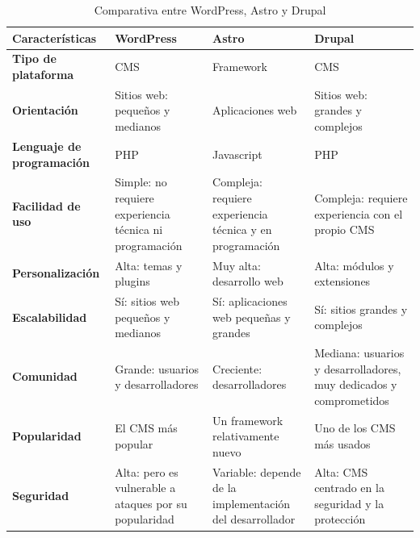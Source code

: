             \begin{table}[!htbp]
                \centering
                
                \small
                
                \begin{tabular}{|>{\centering\arraybackslash}m{3cm}|>{\centering\arraybackslash}m{3.5cm}|>{\centering\arraybackslash}m{3.5cm}|>{\centering\arraybackslash}m{3.5cm}|}
                    \hline
                    \textbf{Características} & \textbf{WordPress} & \textbf{Astro} & \textbf{Drupal} \\
                    \hline
                    \hline
                    \textbf{Tipo de plataforma} & CMS & Framework & CMS \\
                    \hline
                    \textbf{Orientación} & Sitios web: pequeños y medianos & Aplicaciones web & Sitios web: grandes y complejos\\
                    \hline
                    \textbf{Lenguaje de programación} & PHP & Javascript & PHP \\
                    \hline
                    \textbf{Facilidad de uso} & Simple: no requiere experiencia técnica ni programación & Compleja: requiere experiencia técnica y en programación & Compleja: requiere experiencia con el propio CMS \\
                    \hline
                    \textbf{Personalización} & Alta: temas y plugins & Muy alta: desarrollo web & Alta: módulos y extensiones \\
                    \hline
                    \textbf{Escalabilidad} & Sí: sitios web pequeños y medianos & Sí: aplicaciones web pequeñas y grandes & Sí: sitios grandes y complejos \\
                    \hline
                    \textbf{Comunidad} & Grande: usuarios y desarrolladores & Creciente: desarrolladores & Mediana: usuarios y desarrolladores, muy dedicados y comprometidos \\
                    \hline
                    \textbf{Popularidad} & El CMS más popular & Un framework relativamente nuevo & Uno de los CMS más usados \\
                    \hline
                    \textbf{Seguridad} & Alta: pero es vulnerable a ataques por su popularidad & Variable: depende de la implementación del desarrollador & Alta: CMS centrado en la seguridad y la protección \\
                    \hline
                \end{tabular}
                
                \caption{Comparativa entre WordPress, Astro y Drupal}
                \label{tab:wordpress-vs-astro-vs-drupal}
            \end{table}

